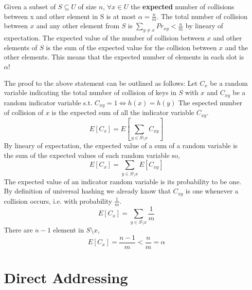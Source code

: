 Given a subset of $S \subseteq U$ of size $n$, $\forall x \in U$ the \textbf{expected} number of collisions between x and other element in S is at most $\alpha = \frac{n}{m}$. The total number of collision between $x$ and any other element from $S$ is $\sum_{y\neq x} Pr_{xy} < \frac{n}{m}$ by lineary of expectation. The expected value of the number of collision between $x$ and other elements of $S$ is the sum of the expected value for the collision between $x$ and the other elements.  This means that the expected number of elements in each slot is $\alpha$!

The proof to the above statement can be outlined as follows:
Let $C_x$ be a random variable indicating the total number of collision of keys in $S$ with $x$ and $C_{xy}$ be a random indicator variable  s.t. $C_{xy}=1 \Longleftrightarrow h(x)=h(y)$
The espected number of collision of $x$ is the expected sum of all the indicator variable $C_{xy}$.
\[
E[C_x] = E[\sum_{y\in S \setminus x} C_{xy}]
\]
By lineary of expectation, the expected value of a sum of a random variable is the sum of the expected values of each random variable so,
\[
E[C_x] = \sum_{y\in S \setminus x} E[C_{xy}]
\]
The expected value of an indicator random variable is its probability to be one. By definition of universal hashing we already know that $C_{xy}$ is one whenever a collision occurs, i.e. with probability $\frac{1}{m}$. 
\[
E[C_x] = \sum_{y\in S \setminus x} \frac{1}{m}
\]
There are $n-1$ element in $S \setminus x$,
\[
E[C_x] = \frac{n-1}{m} < \frac{n}{m}=\alpha
\]

\section{Direct Addressing}